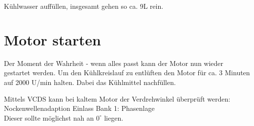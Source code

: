 \documentclass[twoside,a4paper]{refart}
\begin{document}
Kühlwasser auffüllen, insgesamt gehen so ca. 9L rein.

\section{Motor starten}
Der Moment der Wahrheit - wenn alles passt kann der Motor nun wieder gestartet werden.
Um den Kühlkreislauf zu entlüften den Motor für ca. 3 Minuten auf 2000 U/min halten. Dabei das Kühlmittel nachfüllen.

Mittels VCDS kann bei kaltem Motor der Verdrehwinkel überprüft werden:\\ Nockenwellenadaption Einlass Bank 1: Phasenlage\\
Dieser sollte möglichst nah an $0^\circ$ liegen.


\printindex
\end{document}
